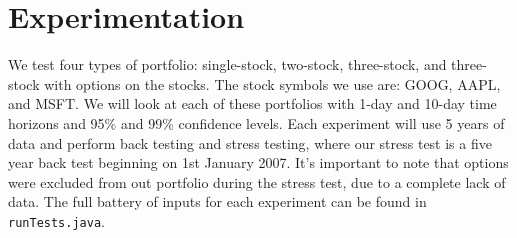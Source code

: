 \documentclass[../Dissertation.tex]{subfiles}
\begin{document}
\section{Experimentation}

We test four types of portfolio: single-stock, two-stock, three-stock, and three-stock with options on the stocks.
The stock symbols we use are: GOOG, AAPL, and MSFT.
We will look at each of these portfolios with 1-day and 10-day time horizons and 95\% and 99\% confidence levels.
Each experiment will use 5 years of data and perform back testing and stress testing, where our stress test is a five year back test beginning on 1st January 2007.
It's important to note that options were excluded from out portfolio during the stress test, due to a complete lack of data.
The full battery of inputs for each experiment can be found in \lstinline|runTests.java|.
\end{document}
